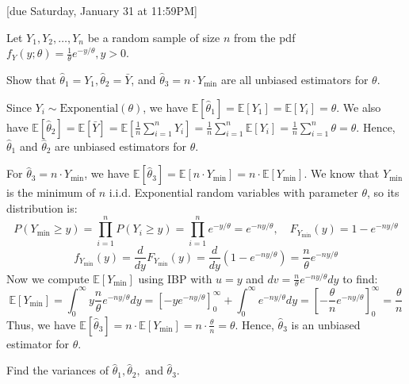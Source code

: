 \documentclass{article}
\newcommand{\E}{\mathbb{E}}
\begin{document}
[due Saturday, January 31 at 11:59PM]

\begin{probset}

\begin{prob}[\textbf{5.4.19}]
    Let $Y_1, Y_2, \ldots, Y_n$ be a random sample of size $n$ from the pdf $f_Y(y; \theta) = \frac{1}{\theta} e^{-y/\theta}, y > 0$.

    \begin{subprobset}
    \begin{subprob}
        Show that $\hat{\theta}_1 = Y_1, \hat{\theta}_2 = \bar Y$, and $\hat{\theta}_3 = n \cdot Y_{\min}$ are all unbiased estimators for $\theta$.

        \begin{soln}
            Since $Y_i \sim \text{Exponential}(\theta)$, we have $\E[\hat\theta_1] = \E[Y_1] = \E[Y_i] = \theta$. We also have $\E[\hat\theta_2] = \E[\bar Y] = \E\left[ \frac{1}{n} \sum_{i=1}^n Y_i \right] = \frac{1}{n} \sum_{i=1}^n \E[Y_i] = \frac{1}{n} \sum_{i=1}^n \theta = \theta$. Hence, $\hat{\theta}_1$ and $\hat{\theta}_2$ are unbiased estimators for $\theta$.

            For $\hat{\theta}_3 = n \cdot Y_{\min}$, we have $\E[\hat{\theta}_3] = \E[n \cdot Y_{\min}] = n \cdot \E[Y_{\min}]$. We know that $Y_{\min}$ is the minimum of $n$ i.i.d. Exponential random variables with parameter $\theta$, so its distribution is:
            \[
                P(Y_{\min} \ge y) = \prod_{i=1}^n P(Y_i \ge y) = \prod_{i=1}^n e^{-y/\theta} = e^{-ny/\theta}, \quad F_{Y_{\min}}(y) = 1 - e^{-ny/\theta}
            \]
            \[
                f_{Y_{\min}}(y) = \frac{d}{dy} F_{Y_{\min}}(y) = \frac{d}{dy} (1 - e^{-ny/\theta}) = \frac{n}{\theta} e^{-ny/\theta}
            \]
            Now we compute $\E[Y_{\min}]$ using IBP with $u = y$ and $dv = \frac{n}{\theta} e^{-ny/\theta} dy$ to find:
            \[
                \E[Y_{\min}] = \int_0^{\infty} y \frac{n}{\theta} e^{-ny/\theta} dy = \left[-y e^{-ny/\theta}\right]_0^{\infty} + \int_0^{\infty} e^{-ny/\theta} dy = \left[-\frac{\theta}{n} e^{-ny/\theta}\right]_0^{\infty} = \frac{\theta}{n}
            \]
            Thus, we have $\E[\hat{\theta}_3] = n \cdot \E[Y_{\min}] = n \cdot \frac{\theta}{n} = \theta$. Hence, $\hat{\theta}_3$ is an unbiased estimator for $\theta$.
        \end{soln}
    \end{subprob}

    \begin{subprob}
        Find the variances of $\hat{\theta}_1, \hat{\theta}_2, \text{ and } \hat{\theta}_3$.


\end{subprob}
\end{subprobset}
\end{prob}
\end{probset}
\end{document}
